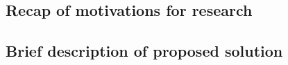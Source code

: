 \subsection{Recap of motivations for research}


\subsection{Brief description of proposed solution}
